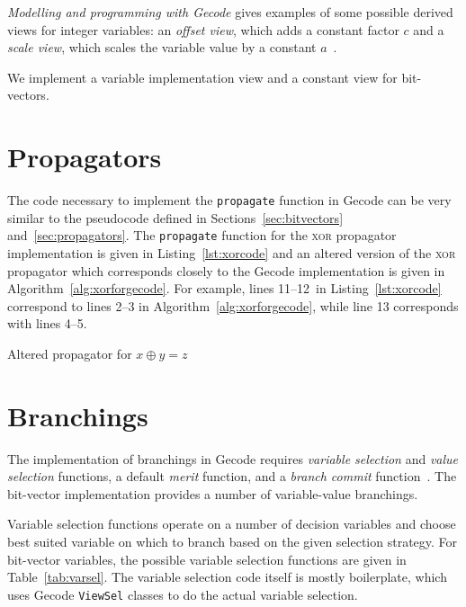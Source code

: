 \documentclass[a4paper,10pt,twoside,openright]{book}
\renewcommand{\sc}[1]{\textsc{\lowercase{#1}}}
\newcommand*\cd[1]{\texttt{#1}}
\begin{document}
\textit{Modelling and programming with Gecode} gives examples of some possible derived views for integer variables:
an \textit{offset view}, which adds a constant factor $c$ and
a \textit{scale view}, which scales the variable value by a constant $a$~\cite{MPG:V}.

We implement a variable implementation view and a constant view for bit-vectors.

\section{Propagators}
The code necessary to implement the \cd{propagate} function in Gecode can be very similar to the 
pseudocode defined in Sections~\ref{sec:bitvectors} and~\ref{sec:propagators}.
The \cd{propagate} function for the \sc{XOR} propagator implementation is given in Listing~\ref{lst:xorcode} 
and an altered version of the \sc{XOR} propagator which corresponds closely to the Gecode implementation is given in Algorithm~\ref{alg:xorforgecode}.
For example, lines 11--12~in Listing~\ref{lst:xorcode} correspond to lines 2--3 in Algorithm~\ref{alg:xorforgecode}, while line 13 corresponds with lines 4--5.

\begin{algorithm}
    \caption{Altered propagator for $x \oplus y = z$}
    \label{alg:xorforgecode}
    \begin{algorithmic}[1]
        
    \end{algorithmic}
\end{algorithm}
\section{Branchings}
The implementation of branchings in Gecode requires 
\textit{variable selection} and \textit{value selection} functions,
a default \textit{merit} function, 
and a \textit{branch commit} function~\cite{MPG:V}.
The bit-vector implementation provides a number of variable-value branchings.

Variable selection functions
operate on a number of decision variables and 
choose best suited variable 
on which to branch
based on the given selection strategy.
For bit-vector variables, 
the possible variable selection functions are given in Table~\ref{tab:varsel}.
The variable selection code itself is mostly boilerplate, 
which uses Gecode \cd{ViewSel} classes to do the actual variable selection.
\end{document}
